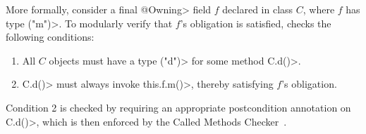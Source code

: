   More formally, consider a final \<@Owning> field $f$ declared in class $C$,
  where
  $f$ has type \MustCall\<("m")>.  To modularly
  verify that $f$'s \MustCall obligation is satisfied, \tool checks the following
  conditions:
  \begin{enumerate}
    \item All $C$ objects must have a type \MustCall\<("d")> for some method \<C.d()>.
    \item \<C.d()> must always invoke \<this.f.m()>, thereby satisfying $f$'s
    \MustCall obligation.
  \end{enumerate}
  Condition 2 is
  checked by requiring an appropriate \EnsuresCalledMethods
  postcondition annotation on
  \<C.d()>, which is then enforced by the Called Methods
  Checker~\cite{KelloggRSSE2020}.



